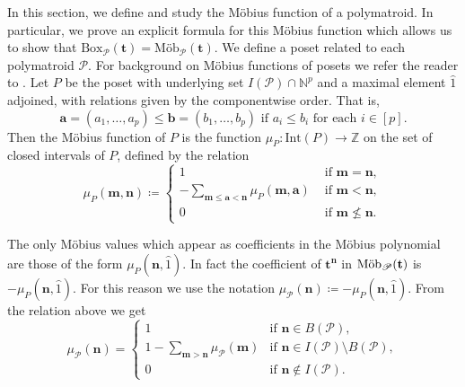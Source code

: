 \documentclass[a4paper, 11pt]{amsart}
\theoremstyle{definition}
\newcommand{\bfm}{\mathbf{m}}
\newcommand{\bfn}{\mathbf{n}}
\newcommand{\bft}{\mathbf{t}}
\newcommand{\bfa}{\mathbf{a}}
\newcommand{\bfb}{\mathbf{b}}
\newcommand{\sP}{\mathscr{P}}
\newcommand{\N}{\mathbb{N}}
\newcommand{\Z}{\mathbb{Z}}
\newcommand{\ds}{\displaystyle}
\DeclareMathOperator{\Mob}{\textnormal{M\"ob}}
\begin{document}
In this section, we define and study the M\"obius function of a polymatroid. In particular, we prove an explicit formula for this M\"obius function which allows us to show that $\textrm{Box}_{\sP}(\bft) = \textrm{M\"ob}_{\sP}(\bft)$. We define a poset related to each polymatroid $\sP$. For background on M\"obius functions of posets we refer the reader to \cite[Section 3.7]{EC1}. Let $P$ be the poset with underlying set $I(\sP) \cap \N^p$ and a maximal element $\hat{1}$ adjoined, with relations given by the componentwise order. That is, $$\bfa = (a_1,\ldots, a_p) \le \bfb = (b_1, \ldots, b_p) \text{ if } a_i \le b_i \text{ for each } i \in [p].$$ Then the M\"obius function of $P$ is the function $\mu_P\colon \mathrm{Int}(P) \to \Z$ on the set of closed intervals of $P$, defined by the relation 
$$\mu_P(\bfm,\bfn) \coloneqq \begin{cases}
    1 &\text{ if }\bfm=\bfn,\\
    -\ds\sum_{\bfm \le \bfa < \bfn}\mu_P(\bfm, \bfa) &\text{ if }\bfm < \bfn,\\
    0 & \text{ if } \bfm \not\le \bfn.
\end{cases}$$


The only M\"obius values which appear as coefficients in the M\"obius polynomial are those of the form $\mu_P(\bfn, \hat{1})$. In fact the coefficient of $\bft^\bfn$ in $\Mob_{\sP}(\bft)$ is $-\mu_P(\bfn, \hat{1})$. For this reason we use the notation  $\mu_{\sP}(\bfn) \coloneqq -\mu_P(\bfn, \hat{1})$. From the relation above we get 
\begin{equation}\label{eqn}\mu_{\sP}(\bfn) = 
\begin{cases}
1 & \text{if } \bfn \in B(\sP),\\
1-\ds\sum_{\bfm >\bfn} \mu_{\sP}(\bfm) &\text{if } \bfn \in I(\sP) \setminus B(\sP),\\
0 & \text{if }\bfn \notin I(\sP). 
\end{cases}
\end{equation}
\end{document}
